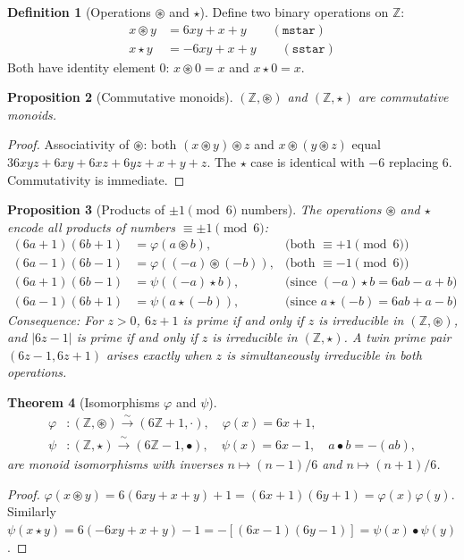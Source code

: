 \documentclass[12pt,a4paper]{amsart}
\theoremstyle{plain}
\newtheorem{theorem}{Theorem}[section]
\newtheorem{proposition}[theorem]{Proposition}
\theoremstyle{definition}
\newtheorem{definition}[theorem]{Definition}
\theoremstyle{remark}
\newcommand{\circstar}{\mathbin{\circledast}}
\newcommand{\bstar}{\mathbin{\star}}
\newcommand{\bbZ}{\mathbb{Z}}
\begin{document}
\begin{definition}[Operations $\circstar$ and $\bstar$]
Define two binary operations on $\bbZ$:
\begin{align*}
  x \circstar y &= 6xy + x + y \qquad (\texttt{mstar})\\
  x \bstar y    &= -6xy + x + y \qquad (\texttt{sstar})
\end{align*}
Both have identity element $0$: $x \circstar 0 = x$ and $x \bstar 0 = x$.
\end{definition}

\begin{proposition}[Commutative monoids]
$(\bbZ, \circstar)$ and $(\bbZ, \bstar)$ are commutative monoids.
\end{proposition}
\begin{proof}
Associativity of $\circstar$: both $(x \circstar y) \circstar z$ and
$x \circstar (y \circstar z)$ equal $36xyz + 6xy + 6xz + 6yz + x + y + z$.
The $\bstar$ case is identical with $-6$ replacing $6$. Commutativity
is immediate.
\end{proof}

\begin{proposition}[Products of $\pm 1 \pmod{6}$ numbers]
The operations $\circstar$ and $\bstar$ encode all products of numbers
$\equiv \pm 1 \pmod{6}$:
\begin{align*}
  (6a+1)(6b+1) &= \varphi(a \circstar b),
    & \text{(both } \equiv +1 \pmod{6}\text{)}\\
  (6a-1)(6b-1) &= \varphi((-a) \circstar (-b)),
    & \text{(both } \equiv -1 \pmod{6}\text{)}\\
  (6a+1)(6b-1) &= \psi((-a) \bstar b),
    & \text{(since }(-a)\bstar b = 6ab - a + b\text{)}\\
  (6a-1)(6b+1) &= \psi(a \bstar (-b)),
    & \text{(since } a \bstar(-b) = 6ab + a - b\text{)}
\end{align*}
\emph{Consequence:} For $z > 0$, $6z+1$ is prime if and only if $z$ is
irreducible in $(\bbZ, \circstar)$, and $|6z-1|$ is prime if and only if
$z$ is irreducible in $(\bbZ, \bstar)$. A twin prime pair $(6z-1, 6z+1)$
arises exactly when $z$ is simultaneously irreducible in both operations.
\end{proposition}

\begin{theorem}[Isomorphisms $\varphi$ and $\psi$]
\label{thm:isos}
\begin{align*}
  \varphi &: (\bbZ, \circstar) \xrightarrow{\;\sim\;} (6\bbZ+1, \cdot),
            \quad \varphi(x) = 6x+1,\\
  \psi    &: (\bbZ, \bstar) \xrightarrow{\;\sim\;} (6\bbZ-1, \bullet),
            \quad \psi(x) = 6x-1, \quad a \bullet b = -(ab),
\end{align*}
are monoid isomorphisms with inverses $n \mapsto (n-1)/6$ and
$n \mapsto (n+1)/6$.
\end{theorem}
\begin{proof}
$\varphi(x \circstar y) = 6(6xy+x+y)+1 = (6x+1)(6y+1) = \varphi(x)\varphi(y)$.
Similarly $\psi(x \bstar y) = 6(-6xy+x+y)-1 = -[(6x-1)(6y-1)] =
\psi(x) \bullet \psi(y)$.
\end{proof}
\end{document}
